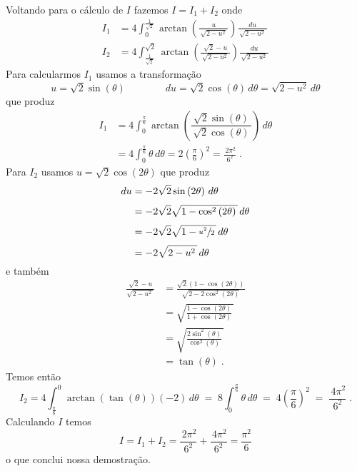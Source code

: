 Voltando para o cálculo de $I$ fazemos $I=I_1+I_2$ onde
\begin{align*}
  I_1 & = 4 \int_{0}^{\frac{1}{\sqrt{2}}}
            \arctan\left(\frac{u}{\,\sqrt{2-u^2}\,}\right)
            \frac{du}{\,\sqrt{2-u^2}\,}
            \\[3mm]
  I_2 & = 4 \int_{\frac{1}{\sqrt{2}}}^{\sqrt{2}}
            \arctan\left(\frac{\sqrt{2}-u}{\,\sqrt{2-u^2}\,}\right)
            \frac{du}{\,\sqrt{2-u^2}\,}
\end{align*}
Para calcularmos $I_1$ usamos a transformação
\[
  u = \sqrt{2} \sin\left(\theta\right)
  \qquad\qquad
  du = \sqrt{2} \cos\left(\theta\right) \,d\theta
     = \sqrt{2-u^2}\,d\theta
\]
que produz
\begin{align*}
  I_1 & = 4 \int_{0}^{\frac{\pi}{6}}
            \arctan\left(\dfrac{  \sqrt{2} \sin\left(\theta\right)}
                               {\,\sqrt{2} \cos\left(\theta\right)\,}\right)
            \,d\theta
            \\[3mm]
      & = 4 \int_{0}^{\frac{\pi}{6}} \theta \,d\theta
        = 2 \left(\frac{\pi}{6}\right)^2
        = \frac{\,2 \pi^2}{6^2}    \;.
\end{align*}
Para $I_2$ usamos \(u = \sqrt{2} \cos\left(2\theta\right)\) que produz
\begin{align*}
  du & = -2\sqrt{2} \sin\left(2\theta\right)                \,d\theta \\[1mm]
     & = -2\sqrt{2} \sqrt{1 - \cos^2\left(2\theta\right)\,} \,d\theta \\[1mm]
     & = -2\sqrt{2} \sqrt{1 - \sfrac{u^2}{2}\,}             \,d\theta \\[1mm]
     & = -2\sqrt{2 - u^2\,}                                 \,d\theta
\end{align*}
e também
\begin{align*}
  \frac{\sqrt{2}-u}{\sqrt{2-u^2\,}}
  & = \frac{\sqrt{2}(1-\cos(2\theta))}{\sqrt{2 - 2\cos^2(2\theta)}} \\[3mm]
  & = \sqrt{\frac{1-\cos(2\theta)}{1 + \cos(2\theta)}\,}            \\[3mm]
  & = \sqrt{\frac{2\sin^2(\theta)}{\cos^2(\theta)}\,}               \\[3mm]
  & = \tan(\theta)  \;.
\end{align*}
Temos então
\[
  I_2   =   4 \int_{\frac{\pi}{6}}^{0} \arctan\left(\tan(\theta)\right) (-2)\,d\theta
      \;=\; 8 \int_{0}^{\frac{\pi}{6}} \theta \,d\theta
      \;=\; 4 \left(\frac{\pi}{6}\right)^2
      \;=\; \frac{\,4 \pi^2}{6^2}  \;.
\]
Calculando $I$ temos
\[
  I = I_1 + I_2
    = \frac{\,2 \pi^2}{6^2}
    + \frac{\,4 \pi^2}{6^2}
    = \frac{\pi^2}{6}
\]
o que conclui nossa demostração.

